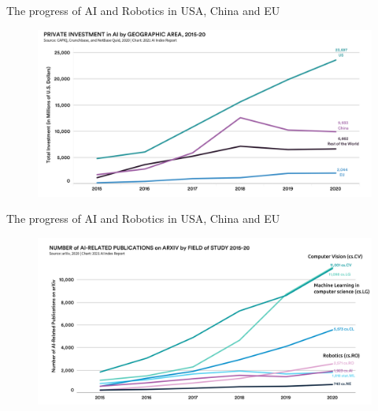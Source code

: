 {

\begin{frame}{The progress of AI and Robotics in USA, China and EU}

\begin{figure}
 \centering
 \includegraphics[width=1.0\textwidth]{./figures/progress-of-air/versions/drawing-v02.png}
\end{figure}

\end{frame}
}



{

\begin{frame}{The progress of AI and Robotics in USA, China and EU}

\begin{figure}
 \centering
 \includegraphics[width=1.0\textwidth]{./figures/progress-of-air/versions/drawing-v01.png}
\end{figure}

\end{frame}
}





